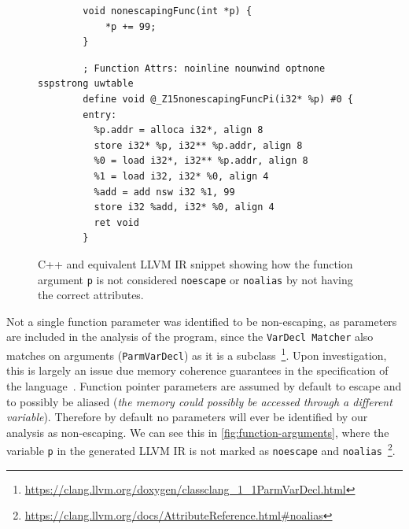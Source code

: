 \documentclass{mpaper}
\begin{document}
    \begin{figure}
        \centering
        \begin{verbatim}
        void nonescapingFunc(int *p) {
            *p += 99;
        }
        \end{verbatim}
        \begin{verbatim}
        ; Function Attrs: noinline nounwind optnone sspstrong uwtable
        define void @_Z15nonescapingFuncPi(i32* %p) #0 {
        entry:
          %p.addr = alloca i32*, align 8
          store i32* %p, i32** %p.addr, align 8
          %0 = load i32*, i32** %p.addr, align 8
          %1 = load i32, i32* %0, align 4
          %add = add nsw i32 %1, 99
          store i32 %add, i32* %0, align 4
          ret void
        }
        \end{verbatim}
        \caption{C++ and equivalent LLVM IR snippet showing how the function argument \texttt{p} is not considered \texttt{noescape} or \texttt{noalias} by not having the correct attributes.}
        \label{fig:function-arguments}
    \end{figure}
    
    Not a single function parameter was identified to be non-escaping, as parameters are included in the analysis of the program, since the \texttt{VarDecl Matcher} also matches on arguments (\texttt{ParmVarDecl}) as it is a subclass~\footnote{\url{https://clang.llvm.org/doxygen/classclang_1_1ParmVarDecl.html}}.
    Upon investigation, this is largely an issue due memory coherence guarantees in the specification of the language~\cite[p.~66]{C++17}. 
    Function pointer parameters are assumed by default to escape and to possibly be aliased (\textit{the memory could possibly be accessed through a different variable}).
    Therefore by default no parameters will ever be identified by our analysis as non-escaping.
    We can see this in \autoref{fig:function-arguments}, where the variable \texttt{p} in the generated LLVM IR is not marked as \texttt{noescape} and \texttt{noalias}~\footnote{\url{https://clang.llvm.org/docs/AttributeReference.html\#noalias}}.
    
\end{document}
